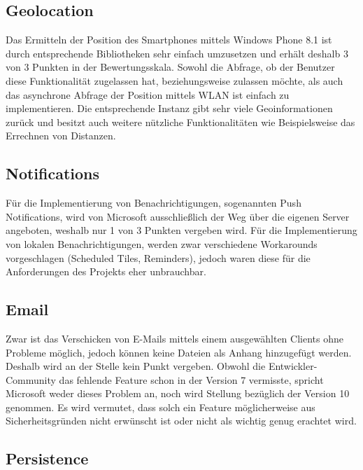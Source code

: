 \subsection{Geolocation}

Das Ermitteln der Position des Smartphones mittels Windows Phone 8.1 ist durch entsprechende Bibliotheken sehr einfach umzusetzen und erhält deshalb 3 von 3 Punkten in der Bewertungsskala. Sowohl die Abfrage, ob der Benutzer diese Funktionalität zugelassen hat, beziehungsweise zulassen möchte, als auch das asynchrone Abfrage der Position mittels WLAN ist einfach zu implementieren. Die entsprechende Instanz gibt sehr viele Geoinformationen zurück und besitzt auch weitere nützliche Funktionalitäten wie Beispielsweise das Errechnen von Distanzen.

\subsection{Notifications}

Für die Implementierung von Benachrichtigungen, sogenannten Push Notifications, wird von Microsoft ausschließlich der Weg über die eigenen Server angeboten, weshalb nur 1 von 3 Punkten vergeben wird. Für die Implementierung von lokalen Benachrichtigungen, werden zwar verschiedene Workarounds vorgeschlagen (Scheduled Tiles, Reminders), jedoch waren diese für die Anforderungen des Projekts eher unbrauchbar.

\subsection{Email}

Zwar ist das Verschicken von E-Mails mittels einem ausgewählten Clients ohne Probleme möglich, jedoch können keine Dateien als Anhang hinzugefügt werden. Deshalb wird an der Stelle kein Punkt vergeben. Obwohl die Entwickler-Community das fehlende Feature schon in der Version 7 vermisste, spricht Microsoft weder dieses Problem an, noch wird Stellung bezüglich der Version 10 genommen. Es wird vermutet, dass solch ein Feature möglicherweise aus Sicherheitsgründen nicht erwünscht ist oder nicht als wichtig genug erachtet wird.

\subsection{Persistence}

